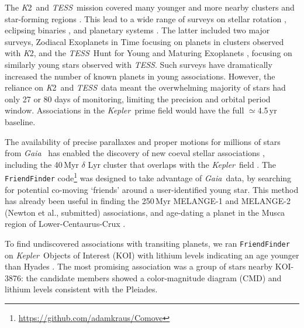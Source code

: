 \documentclass[twocolumn, linenumbers]{aastex631}
\newcommand{\kepler}{{\it Kepler}}
\newcommand{\tess}{\textit{TESS}}
\newcommand{\ktwo}{{\textit K2}}
\newcommand{\gaia}{\textit{Gaia}}
\begin{document}
The \ktwo\ and \tess\ mission covered many younger and more nearby clusters and star-forming regions \citep{2014SPIE.9143E..20R, VanCleve2016}. This lead to a wide range of surveys on stellar rotation \citep[e.g.,][]{2017ApJ...839...92R, Douglas:2019}, eclipsing binaries \citep[e.g.,][]{Kraus2015, David2019}, and planetary systems \citep[e.g.,][]{Gaidos:2017aa, 2019ApJ...885L..12D}. The latter included two major surveys, Zodiacal Exoplanets in Time \citep[ZEIT;][]{Mann2016a} focusing on planets in clusters observed with \ktwo, and the \tess\ Hunt for Young and Maturing Exoplanets \citep[THYME;][]{THYMEI}, focusing on similarly young stars observed with \tess. Such surveys have dramatically increased the number of known planets in young associations. However, the reliance on \ktwo\ and \tess\ data meant the overwhelming majority of stars had only 27 or 80 days of monitoring, limiting the precision and orbital period window. Associations in the \kepler\ prime field would have the full $\simeq$4.5\,yr baseline.

The availability of precise parallaxes and proper motions for millions of stars from \gaia\ \citep{Gaia_mission2016, GaiaEDR3} has enabled the discovery of new coeval stellar associations \citep[e.g.,][]{2019A&A...622L..13M, 2021arXiv210509338K}, including the 40\,Myr $\delta$ Lyr cluster that overlaps with the \kepler\ field \citep{2021arXiv211214776B}. The \texttt{FriendFinder} code\footnote{\url{https://github.com/adamkraus/Comove}} \citep{THYMEV} was designed to take advantage of \gaia\ data, by searching for potential co-moving `friends' around a user-identified young star. This method has already been useful in finding the 250\,Myr MELANGE-1 \citep{THYMEV} and MELANGE-2 (Newton et al., submitted) associations, and age-dating a planet in the Musca region of Lower-Centaurus-Crux \citep{THYMEVI}. 

To find undiscovered associations with transiting planets, we ran \texttt{FriendFinder} on \kepler\ Objects of Interest (KOI) with lithium levels indicating an age younger than Hyades \citep{2018ApJ...855..115B}. The most promising association was a group of stars nearby KOI-3876: the candidate members showed a color-magnitude diagram (CMD) and lithium levels consistent with the Pleiades.
\end{document}
